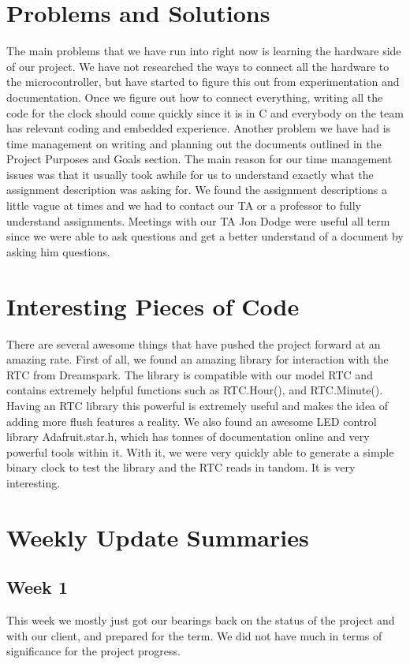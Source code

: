 \documentclass[onecolumn, draftclsnofoot,10pt, compsoc]{IEEEtran}
\begin{document}
\section{Problems and Solutions}
The main problems that we have run into right now is learning the hardware side of our project.
We have not researched the ways to connect all the hardware to the microcontroller, but have started to figure this out from experimentation and documentation.
Once we figure out how to connect everything, writing all the code for the clock should come quickly since it is in C and everybody on the team has relevant coding and embedded experience.
Another problem we have had is time management on writing and planning out the documents outlined in the Project Purposes and Goals section.
The main reason for our time management issues was that it usually took awhile for us to understand exactly what the assignment description was asking for.
We found the assignment descriptions a little vague at times and we had to contact our TA or a professor to fully understand assignments.
Meetings with our TA Jon Dodge were useful all term since we were able to ask questions and get a better understand of a document by asking him questions.

\section{Interesting Pieces of Code}
There are several awesome things that have pushed the project forward at an amazing rate.
First of all, we found an amazing library for interaction with the RTC from Dreamspark.
The library is compatible with our model RTC and contains extremely helpful functions such as RTC.Hour(), and RTC.Minute().
Having an RTC library this powerful is extremely useful and makes the idea of adding more flush features a reality.
We also found an awesome LED control library Adafruit.star.h, which has tonnes of documentation online and very powerful tools within it.
With it, we were very quickly able to generate a simple binary clock to test the library and the RTC reads in tandom.
It is very interesting.

\section{Weekly Update Summaries}
\subsection{Week 1}
This week we mostly just got our bearings back on the status of the project and with our client, and prepared for the term.
We did not have much in terms of significance for the project progress.
\end{document}
